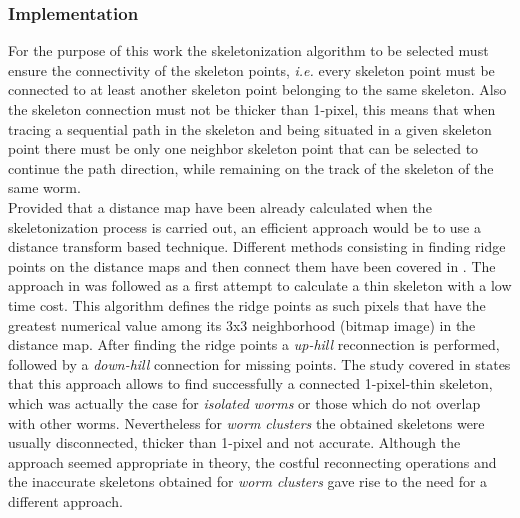 \subsubsection{Implementation}
\label{sec:skeletonimp}

For the purpose of this work the skeletonization algorithm to be selected must
ensure the connectivity of the skeleton points, \emph{i.e.} every skeleton point
must be connected to at least another skeleton point belonging to the same
skeleton. Also the skeleton connection must not be thicker than 1-pixel, this means that
when tracing a sequential path in the skeleton and being situated in a given skeleton 
point there must be only one neighbor skeleton point that can be selected to continue
the path direction, while remaining on the track of the skeleton of the same worm.\\

Provided that a distance map have been already calculated when the skeletonization 
process is carried out, an efficient approach would be to use a distance transform
based technique. Different methods consisting in finding ridge points on the distance
maps and then connect them have been covered in \cite{maxima,euclideancentre,ridgedt}.
The approach in \cite{maxima} was followed as a first attempt to calculate a thin
skeleton with a low time cost. This algorithm defines the ridge points as such pixels
that have the greatest numerical value among its 3x3 neighborhood (bitmap image) in the 
distance map. After finding the ridge points a \emph{up-hill} reconnection is performed, 
followed by a \emph{down-hill} connection for missing points. The study covered in \cite{maxima}
states that this approach allows to find successfully a connected 1-pixel-thin skeleton,
which was actually the case for \emph{isolated worms} or those which do not
overlap with other worms. Nevertheless for \emph{worm clusters} the obtained skeletons
were usually disconnected, thicker than 1-pixel and not accurate. Although the approach
seemed appropriate in theory, the costful reconnecting operations and the inaccurate
skeletons obtained for \emph{worm clusters} gave rise to the need for a different
approach.\\

